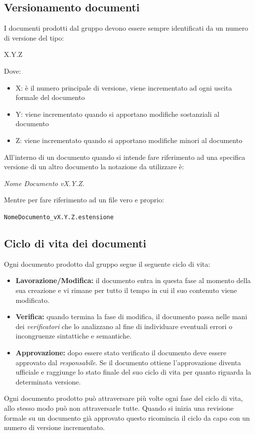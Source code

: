 \documentclass[a4paper]{report}
\begin{document}
	\subsection{Versionamento documenti}
	I documenti prodotti dal gruppo devono essere sempre identificati da un numero di versione del tipo:
	\begin{center}
		X.Y.Z
	\end{center}
	Dove:
	\begin{itemize}
		\item X: è il numero principale di versione, viene incrementato ad ogni uscita formale del documento
		\item Y: viene incrementato quando si apportano modifiche sostanziali al documento
		\item Z: viene incrementato quando si apportano modifiche minori al documento
	\end{itemize}
	All'interno di un documento quando si intende fare riferimento ad una specifica versione di un altro documento la
	notazione da utilizzare è: 
	\begin{center}
		\emph{Nome Documento vX.Y.Z}.
	\end{center}
	Mentre per fare riferimento ad un file vero e proprio:
	\begin{center}
		\verb|NomeDocumento_vX.Y.Z.estensione|
	\end{center}
	\subsection{Ciclo di vita dei documenti}
	Ogni documento prodotto dal gruppo segue il seguente ciclo di vita:
	\begin{itemize}
		\item \textbf{Lavorazione/Modifica:} il documento entra in questa fase al momento della sua creazione e vi
		rimane per tutto il tempo in cui il suo contenuto viene modificato.
		\item \textbf{Verifica:} quando termina la fase di modifica, il documento passa nelle mani dei
		\emph{verificatori}
		che lo analizzano al fine di individuare eventuali errori o incongruenze sintattiche e semantiche.
		\item \textbf{Approvazione:} dopo essere stato verificato il documento deve essere approvato dal
		\emph{responsabile}. Se il documento ottiene l'approvazione diventa ufficiale e raggiunge lo stato finale del
		suo ciclo di vita per quanto riguarda la determinata versione.
	\end{itemize}
	Ogni documento prodotto può attraversare più volte ogni fase del ciclo di vita, allo stesso modo può non
	attraversarle tutte. Quando si inizia una revisione formale su un documento già approvato questo ricomincia il
	ciclo da capo con un numero di versione incrementato.
\end{document}
